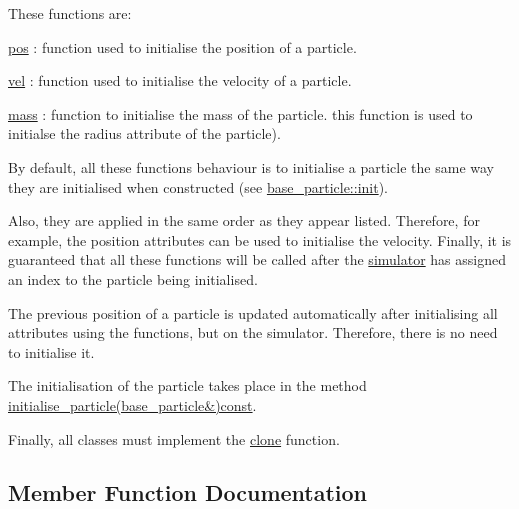 These functions are\+:
\begin{DoxyItemize}
\item \hyperlink{classphysim_1_1emitters_1_1base__emitter_ac67584a2ca34232c1f4f04c41599df0e}{pos} \+: function used to initialise the position of a particle.
\item \hyperlink{classphysim_1_1emitters_1_1base__emitter_a9ea19d96450cff65882371b61a2294c8}{vel} \+: function used to initialise the velocity of a particle.
\item \hyperlink{classphysim_1_1emitters_1_1base__emitter_a4e1b65730afef86899544d3306f7547d}{mass} \+: function to initialise the mass of the particle. this function is used to initialse the radius attribute of the particle).
\end{DoxyItemize}

By default, all these function\textquotesingle{}s behaviour is to initialise a particle the same way they are initialised when constructed (see \hyperlink{classphysim_1_1particles_1_1base__particle_a3bba517d51fd0bff7ec583e701765f87}{base\+\_\+particle\+::init}).

Also, they are applied in the same order as they appear listed. Therefore, for example, the position attributes can be used to initialise the velocity. Finally, it is guaranteed that all these functions will be called after the \hyperlink{classphysim_1_1simulator}{simulator} has assigned an index to the particle being initialised.

The previous position of a particle is updated automatically after initialising all attributes using the functions, but on the simulator. Therefore, there is no need to initialise it.

The initialisation of the particle takes place in the method \hyperlink{classphysim_1_1emitters_1_1base__emitter_a8549c2d921e3a47d15705a6143527ca2}{initialise\+\_\+particle(base\+\_\+particle\&)const}.

Finally, all classes must implement the \hyperlink{classphysim_1_1emitters_1_1base__emitter_ab97486c7e3855fca1f08eedbb97c8c0e}{clone} function. 

\subsection{Member Function Documentation}
\mbox{\label{classphysim_1_1emitters_1_1base__emitter_a8549c2d921e3a47d15705a6143527ca2}} 
